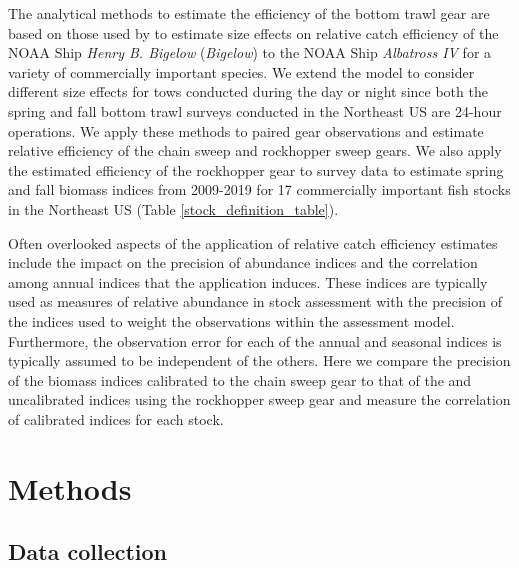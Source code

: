 \documentclass[
  12pt,
]{article}
\begin{document}
The analytical methods to estimate the efficiency of the bottom trawl
gear are based on those used by \citet{miller13} to estimate size
effects on relative catch efficiency of the NOAA Ship \emph{Henry B.
Bigelow} (\emph{Bigelow}) to the NOAA Ship \emph{Albatross IV} for a
variety of commercially important species. We extend the model to
consider different size effects for tows conducted during the day or
night since both the spring and fall bottom trawl surveys conducted in
the Northeast US are 24-hour operations. We apply these methods to
paired gear observations and estimate relative efficiency of the chain
sweep and rockhopper sweep gears. We also apply the estimated efficiency
of the rockhopper gear to survey data to estimate spring and fall
biomass indices from 2009-2019 for 17 commercially important fish stocks
in the Northeast US (Table \ref{stock_definition_table}).

Often overlooked aspects of the application of relative catch efficiency
estimates include the impact on the precision of abundance indices and
the correlation among annual indices that the application induces. These
indices are typically used as measures of relative abundance in stock
assessment with the precision of the indices used to weight the
observations within the assessment model. Furthermore, the observation
error for each of the annual and seasonal indices is typically assumed
to be independent of the others. Here we compare the precision of the
biomass indices calibrated to the chain sweep gear to that of the and
uncalibrated indices using the rockhopper sweep gear and measure the
correlation of calibrated indices for each stock.

\hypertarget{methods}{%
\section{Methods}\label{methods}}

\hypertarget{data-collection}{%
\subsection{Data collection}\label{data-collection}}
\end{document}

